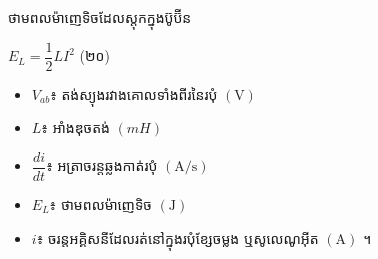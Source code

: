 \vspace{0.5em}
\noindent
\begin{formulabox}[breakable=false]{
	ថាមពលម៉ាញេទិចដែលស្តុកក្នុងប៊ូប៊ីន}
	\begin{center}
		$\boxed{E_L = \dfrac{1}{2}LI^2}$ \quad (២០)
	\end{center}
	\begin{itemize}[itemsep=2pt, topsep=4pt, parsep=0pt, leftmargin=1.6em]
		\item $V_{ab}$៖ តង់ស្យុងរវាងគោលទាំងពីរនៃរបុំ $(\mathrm{V})$
		\item $L$៖ អាំងឌុចតង់ $(\mathrm{}m{H})$
		\item $\dfrac{di}{dt}$៖ អត្រាចរន្តឆ្លងកាត់របុំ $(\mathrm{A/s})$
		\item $E_L$៖ ថាមពលម៉ាញេទិច $(\mathrm{J})$
		\item $i$៖ ចរន្តអគ្គិសនីដែលរត់នៅក្នុងរបុំខ្សែចម្លង ឬសូលេណូអ៊ីត $(\mathrm{A})$ ។
	\end{itemize}
\end{formulabox}

\vspace{0.5em}



